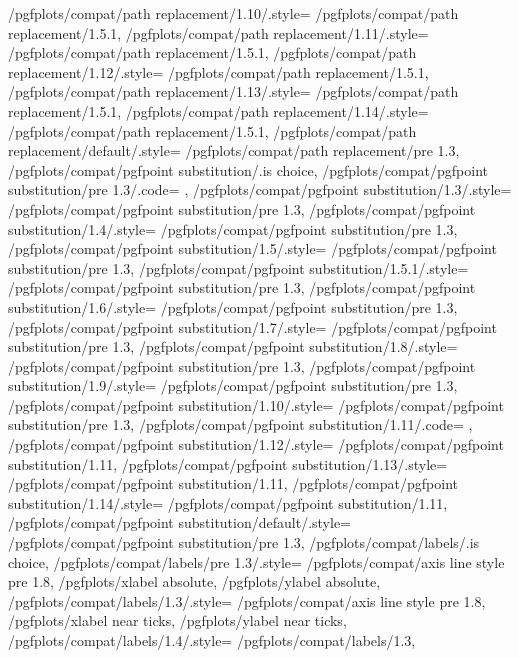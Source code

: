 {	/pgfplots/compat/path replacement/1.10/.style=   	{/pgfplots/compat/path replacement/1.5.1},
	/pgfplots/compat/path replacement/1.11/.style=   	{/pgfplots/compat/path replacement/1.5.1},
	/pgfplots/compat/path replacement/1.12/.style=   	{/pgfplots/compat/path replacement/1.5.1},
	/pgfplots/compat/path replacement/1.13/.style=   	{/pgfplots/compat/path replacement/1.5.1},
	/pgfplots/compat/path replacement/1.14/.style=   	{/pgfplots/compat/path replacement/1.5.1},
	/pgfplots/compat/path replacement/default/.style=	{/pgfplots/compat/path replacement/pre 1.3},%
	/pgfplots/compat/pgfpoint substitution/.is choice,
	/pgfplots/compat/pgfpoint substitution/pre 1.3/.code= {\pgfplots@substitute@pgfpointfalse},
	/pgfplots/compat/pgfpoint substitution/1.3/.style=    {/pgfplots/compat/pgfpoint substitution/pre 1.3},%
	/pgfplots/compat/pgfpoint substitution/1.4/.style=  	 {/pgfplots/compat/pgfpoint substitution/pre 1.3},
	/pgfplots/compat/pgfpoint substitution/1.5/.style=    {/pgfplots/compat/pgfpoint substitution/pre 1.3},%
	/pgfplots/compat/pgfpoint substitution/1.5.1/.style=	{/pgfplots/compat/pgfpoint substitution/pre 1.3},%
	/pgfplots/compat/pgfpoint substitution/1.6/.style=   	{/pgfplots/compat/pgfpoint substitution/pre 1.3},
	/pgfplots/compat/pgfpoint substitution/1.7/.style=   	{/pgfplots/compat/pgfpoint substitution/pre 1.3},
	/pgfplots/compat/pgfpoint substitution/1.8/.style=   	{/pgfplots/compat/pgfpoint substitution/pre 1.3},
	/pgfplots/compat/pgfpoint substitution/1.9/.style=   	{/pgfplots/compat/pgfpoint substitution/pre 1.3},
	/pgfplots/compat/pgfpoint substitution/1.10/.style=   	{/pgfplots/compat/pgfpoint substitution/pre 1.3},
	/pgfplots/compat/pgfpoint substitution/1.11/.code=   	{\pgfplots@substitute@pgfpointtrue},
	/pgfplots/compat/pgfpoint substitution/1.12/.style=   	{/pgfplots/compat/pgfpoint substitution/1.11},
	/pgfplots/compat/pgfpoint substitution/1.13/.style=   	{/pgfplots/compat/pgfpoint substitution/1.11},
	/pgfplots/compat/pgfpoint substitution/1.14/.style=   	{/pgfplots/compat/pgfpoint substitution/1.11},
	/pgfplots/compat/pgfpoint substitution/default/.style=	{/pgfplots/compat/pgfpoint substitution/pre 1.3},%
	/pgfplots/compat/labels/.is choice,
	/pgfplots/compat/labels/pre 1.3/.style={%
		/pgfplots/compat/axis line style pre 1.8,
		/pgfplots/xlabel absolute,
		/pgfplots/ylabel absolute},%
	/pgfplots/compat/labels/1.3/.style={%
		/pgfplots/compat/axis line style pre 1.8,
		/pgfplots/xlabel near ticks,
		/pgfplots/ylabel near ticks},%
	/pgfplots/compat/labels/1.4/.style=		{/pgfplots/compat/labels/1.3},%
}
